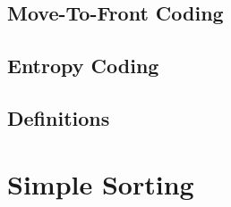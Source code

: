 \documentclass[a4paper]{scrreprt}
\begin{document}
\section{Move-To-Front Coding}

\section{Entropy Coding}

\section{Definitions}

\chapter{Simple Sorting}
\end{document}
